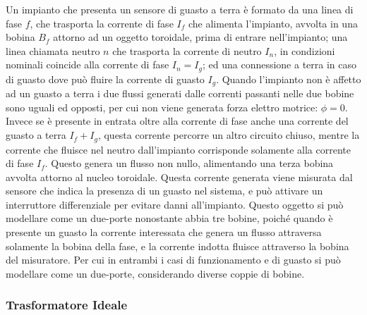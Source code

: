 \documentclass{article}
\numberwithin{equation}{subsection}
\begin{document}
Un impianto che presenta un sensore di guasto a terra è formato da una linea di fase $f$, che trasporta la corrente di fase $I_f$ che alimenta l'impianto, avvolta in una 
bobina $B_f$ attorno ad un oggetto toroidale, prima di entrare nell'impianto; una linea chiamata neutro $n$ che trasporta la corrente di neutro $I_n$, in condizioni nominali 
coincide alla corrente di fase $I_n=I_g$; ed una connessione a terra in caso di guasto dove può fluire la corrente di guasto $I_g$. 
Quando l'impianto non è affetto ad un guasto a terra i due flussi generati dalle correnti passanti nelle due bobine sono uguali ed opposti, per cui non viene generata 
forza elettro motrice: $\phi=0$. Invece se è presente in entrata oltre alla corrente di fase anche una corrente del guasto a terra $I_f+I_g$, questa corrente percorre un 
altro circuito chiuso, mentre la corrente che fluisce nel neutro dall'impianto corrisponde solamente alla corrente di fase $I_f$. Questo genera un flusso non nullo, 
alimentando una terza bobina avvolta attorno al nucleo toroidale. Questa corrente generata viene misurata dal sensore che indica la presenza di un guasto nel sistema, e può 
attivare un interruttore differenziale per evitare danni all'impianto. 
Questo oggetto si può modellare come un due-porte nonostante abbia tre bobine, poiché quando è presente un guasto la corrente interessata che genera un flusso attraversa 
solamente la bobina della fase, e la corrente indotta fluisce attraverso la bobina del misuratore. Per cui in entrambi i casi di funzionamento e di guasto si può modellare 
come un due-porte, considerando diverse coppie di bobine. 

\subsubsection{Trasformatore Ideale}
\end{document}
